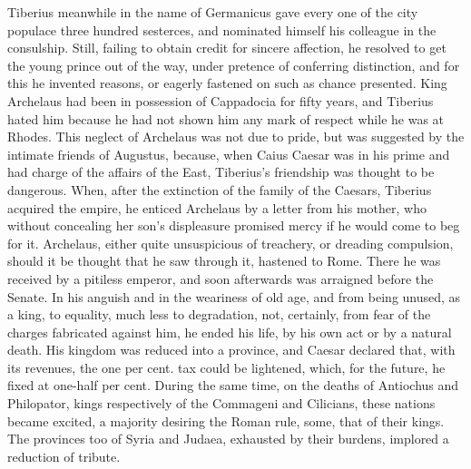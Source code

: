 Tiberius meanwhile in the name of Germanicus gave every one of the city populace three hundred sesterces, and nominated himself his colleague in the consulship. Still, failing to obtain credit for sincere affection, he resolved to get the young prince out of the way, under pretence of conferring distinction, and for this he invented reasons, or eagerly fastened on such as chance presented. King Archelaus had been in possession of Cappadocia for fifty years, and Tiberius hated him because he had not shown him any mark of respect while he was at Rhodes. This neglect of Archelaus was not due to pride, but was suggested by the intimate friends of Augustus, because, when Caius Caesar was in his prime and had charge of the affairs of the East, Tiberius's friendship was thought to be dangerous. When, after the extinction of the family of the Caesars, Tiberius acquired the empire, he enticed Archelaus by a letter from his mother, who without concealing her son's displeasure promised mercy if he would come to beg for it. Archelaus, either quite unsuspicious of treachery, or dreading compulsion, should it be thought that he saw through it, hastened to Rome. There he was received by a pitiless emperor, and soon afterwards was arraigned before the Senate. In his anguish and in the weariness of old age, and from being unused, as a king, to equality, much less to degradation, not, certainly, from fear of the charges fabricated against him, he ended his life, by his own act or by a natural death. His kingdom was reduced into a province, and Caesar declared that, with its revenues, the one per cent. tax could be lightened, which, for the future, he fixed at one-half per cent. During the same time, on the deaths of Antiochus and Philopator, kings respectively of the Commageni and Cilicians, these nations became excited, a majority desiring the Roman rule, some, that of their kings. The provinces too of Syria and Judaea, exhausted by their burdens, implored a reduction of tribute.


